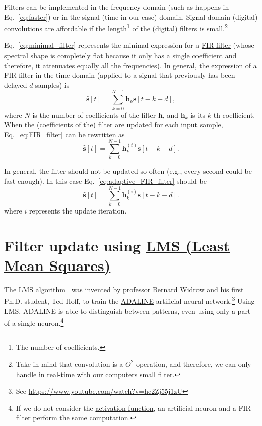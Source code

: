 Filters can be implemented in the frequency domain (such as happens in
Eq.~\eqref{eq:faster}) or in the signal (time in our case)
domain. Signal domain (digital) convolutions are affordable if the
length\footnote{The number of coefficients.} of the (digital) filters
is small.\footnote{Take in mind that convolution is a $O^2$ operation,
  and therefore, we can only handle in real-time with our computers
  small filter.}

Eq.~\eqref{eq:minimal_filter} represents the minimal expression for a
\href{https://en.wikipedia.org/wiki/Finite_impulse_response}{FIR
  filter} (whose spectral shape is completely flat because it only has
a single coefficient and therefore, it attenuates equally all the
frequencies). In general, the expression of a FIR filter in the
time-domain (applied to a signal that previously has been delayed $d$
samples) is
\begin{equation}
  \hat{\mathbf s}[t] = \sum_{k=0}^{N-1}{\mathbf h}_k{\mathbf s}[t-k-d],
  \label{eq:FIR_filter}
\end{equation}
where $N$ is the number of coefficients of the filter ${\mathbf h}$,
and ${\mathbf h}_k$ is its $k$-th coefficient. When the (coefficients
of the) filter are updated for each input sample,
Eq.~\eqref{eq:FIR_filter} can be rewritten as
\begin{equation}
  \hat{\mathbf s}[t] = \sum_{k=0}^{N-1}{\mathbf h}_k^{(t)}{\mathbf s}[t-k-d].
  \label{eq:adaptive_FIR_filter}
\end{equation}

In general, the filter should not be updated so often (e.g., every
second could be fast enough). In this case
Eq.~\eqref{eq:adaptive_FIR_filter} should be
\begin{equation}
  \hat{\mathbf s}[t] = \sum_{k=0}^{N-1}{\mathbf h}_k^{(i)}{\mathbf s}[t-k-d].
  \label{eq:adaptive_FIR_filter_second}
\end{equation}
where $i$ represents the update iteration.

\section{Filter update using \href{https://en.wikipedia.org/wiki/Least_mean_squares_filter}{LMS (Least Mean Squares)}}

The LMS algorithm~\cite{haykin1995adaptive,boyd2004convex} was
invented by professor Bernard Widrow and his first Ph.D. student, Ted
Hoff, to train the
\href{https://en.wikipedia.org/wiki/ADALINE}{ADALINE} artificial
neural network.\footnote{See
  \url{https://www.youtube.com/watch?v=hc2Zj55j1zU}} Using LMS,
ADALINE is able to distinguish between patterns, even using only a
part of a single neuron.\footnote{If we do not consider the
  \href{https://en.wikipedia.org/wiki/Activation_function}{activation
    function}, an artificial neuron and a FIR filter perform the same
  computation.}

